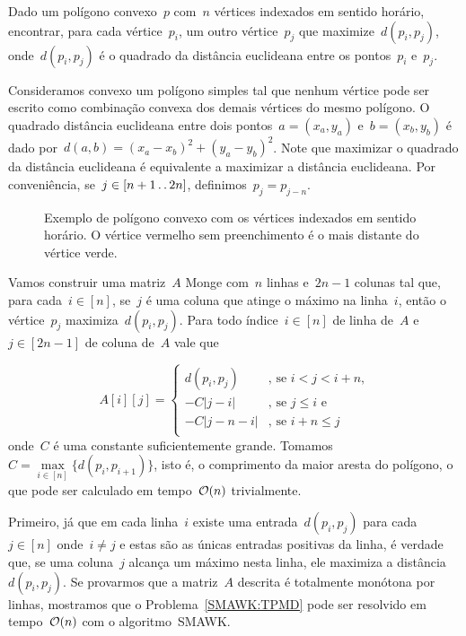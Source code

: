 \begin{prob} \label{SMAWK:TPMD}
Dado um polígono convexo~$p$ com~$n$ vértices indexados em sentido horário, encontrar, para cada vértice~$p_i$, um outro vértice~$p_j$ que maximize~$d(p_i,p_j)$, onde~$d(p_i,p_j)$ é o quadrado da distância euclideana entre os pontos~$p_i$ e~$p_j$.
\end{prob}

Consideramos convexo um polígono simples tal que nenhum vértice pode ser escrito como combinação convexa dos demais vértices do mesmo polígono. O quadrado distância euclideana entre dois pontos~${ a = (x_a,y_a) }$ e~${ b = (x_b,y_b) }$ é dado por~${ d(a,b) = (x_a - x_b)^2 + (y_a - y_b)^2 }$. Note que maximizar o quadrado da distância euclideana é equivalente a maximizar a distância euclideana. Por conveniência, se~$j \in [n+1 \,.\,.\, 2n]$, definimos~$p_j = p_{j-n}$.

\begin{figure}[h]
    \centering
    
    \caption{Exemplo de polígono convexo com os vértices indexados em sentido horário. O vértice vermelho sem preenchimento é o mais distante do vértice verde.} \label{SMAWK:Polygon}
\end{figure}

Vamos construir uma matriz~$A$ Monge com~$n$ linhas e~$2n - 1$ colunas tal que, para cada~$i \in [n]$, se~$j$ é uma coluna que atinge o máximo na linha~$i$, então o vértice~$p_{j}$ maximiza~$d(p_i,p_j)$. Para todo índice~$i \in [n]$ de linha de~$A$ e~$j \in [2n - 1]$ de coluna de~$A$ vale que

\begin{equation*}
A[i][j] = \begin{cases}
d(p_i,p_j) & \text{, se } i < j < i+n \text{,} \\
-C|j - i| & \text{, se } j \leq i \text{ e } \\
-C|j - n - i| & \text{, se } i + n \leq j \\
\end{cases}
\end{equation*}
onde~$C$ é uma constante suficientemente grande. Tomamos~$C = \max\limits_{i \in [n]}\{d(p_i,p_{i+1})\}$, isto é, o comprimento da maior aresta do polígono, o que pode ser calculado em tempo~$\mathcal{O}(n)$ trivialmente.

Primeiro, já que em cada linha~$i$ existe uma entrada~$d(p_i,p_j)$ para cada~$j \in [n]$ onde~$i \neq j$ e estas são as únicas entradas positivas da linha, é verdade que, se uma coluna~$j$ alcança um máximo nesta linha, ele maximiza a distância~$d(p_i,p_j)$. Se provarmos que a matriz~$A$ descrita é totalmente monótona por linhas, mostramos que o Problema~\ref{SMAWK:TPMD} pode ser resolvido em tempo~$\mathcal{O}(n)$ com o algoritmo~\textsc{SMAWK}.

